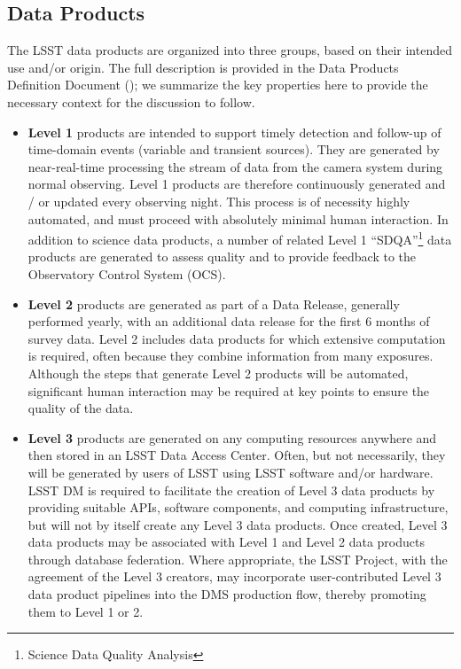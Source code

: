 \subsection{Data Products}

The LSST data products are organized into three groups, based on their intended use and/or origin. The full description is provided in the Data Products Definition Document (\DPDD); we summarize the key properties here to provide the necessary context for the discussion to follow.

\begin{itemize}
\item \textbf{Level 1} products are intended to support timely detection and follow-up
  of time-domain events (variable and transient sources). They are generated by
  near-real-time processing the stream of data from the camera system during
  normal observing.  Level 1 products are therefore continuously generated and / or
  updated every observing night. This process is of necessity highly
  automated, and must proceed with absolutely minimal human
  interaction.  In addition to science data products, a number of related
  Level 1 ``SDQA''\footnote{Science Data Quality Analysis} data products are generated
  to assess quality and to provide feedback to the Observatory Control System (OCS).

\item \textbf{Level 2} products are generated as part of a Data Release, generally
  performed
  yearly, with an additional data release for the first 6 months of survey data.
  Level 2 includes data products for which extensive
  computation is required, often because they combine information from
  many exposures.  Although the steps that generate Level 2 products
  will be automated, significant human interaction may be required at
  key points to ensure the quality of the data.

\item \textbf{Level 3} products are generated on any computing resources
  anywhere and then stored in an LSST Data Access Center. Often, but not
  necessarily, they will be generated by users of LSST using LSST software
  and/or hardware. LSST DM is required to facilitate the creation of
  Level 3 data products by providing suitable APIs, software components, and
  computing infrastructure, but will not by itself create any Level 3
  data products. Once created, Level 3 data products may be associated with
  Level 1 and Level 2 data products through database federation.
  Where appropriate, the LSST Project, with the agreement of the Level 3
  creators, may incorporate user-contributed Level 3 data product pipelines
  into the DMS production flow, thereby promoting them to Level 1 or 2.

\end{itemize}

